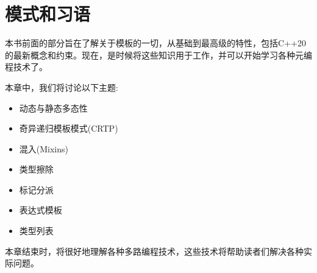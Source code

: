 \chapter{模式和习语}

本书前面的部分旨在了解关于模板的一切，从基础到最高级的特性，包括C++20的最新概念和约束。现在，是时候将这些知识用于工作，并可以开始学习各种元编程技术了。

本章中，我们将讨论以下主题:

\begin{itemize}
  \item 动态与静态多态性
  \item 奇异递归模板模式(CRTP)
  \item 混入(Mixins)
  \item 类型擦除
  \item 标记分派
  \item 表达式模板
  \item 类型列表
\end{itemize}

本章结束时，将很好地理解各种多路编程技术，这些技术将帮助读者们解决各种实际问题。









